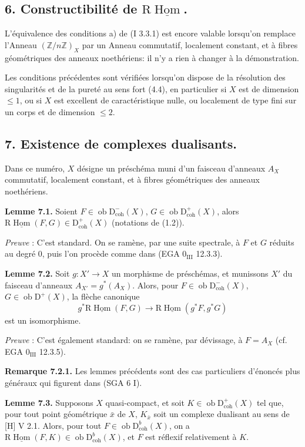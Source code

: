 \documentclass[11pt]{article}
\DeclareMathOperator{\Hom}{Hom}
\newcommand{\R}{\mathrm{R}}\newcommand{\RHomCore}{\mathrm{RHom}}
\newcommand{\D}{\mathrm{D}}
\newcommand{\Z}{\mathbb{Z}}
\newcommand{\ob}{\operatorname{ob}}
\providecommand{\Hom}{\operatorname{Hom}}
\providecommand{\ob}{\operatorname{ob}}
\providecommand{\R}{\mathrm R}
\providecommand{\Z}{\mathbb Z}
\providecommand{\Hom}{\operatorname{Hom}}
\begin{document}
\subsection*{6. Constructibilité de $\R\underline{\Hom}$.}

L'équivalence des conditions a) de (I 3.3.1) est encore valable lorsqu'on remplace l'Anneau $(\Z/n\Z)_X$ par un Anneau commutatif, localement constant, et à fibres géométriques des anneaux noethériens: il n'y a rien à changer à la démonstration.

Les conditions précédentes sont vérifiées lorsqu'on dispose de la résolution des singularités et de la pureté au sens fort (4.4), en particulier si $X$ est de dimension $\leq1$, ou si $X$ est excellent de caractéristique nulle, ou localement de type fini sur un corps et de dimension $\leq2$.

\subsection*{7. Existence de complexes dualisants.}

Dans ce numéro, $X$ désigne un préschéma muni d'un faisceau d'anneaux $A_X$ commutatif, localement constant, et à fibres géométriques des anneaux noethériens.

\textbf{Lemme 7.1.} Soient $F\in\ob\D^{-}_{\mathrm{coh}}(X)$, $G\in\ob\D^{+}_{\mathrm{coh}}(X)$, alors $\R\underline{\Hom}(F,G)\in\D^{+}_{\mathrm{coh}}(X)$ (notations de (1.2)).

\emph{Preuve} : C'est standard. On se ramène, par une suite spectrale, à $F$ et $G$ réduits au degré $0$, puis l'on procède comme dans (EGA $0_{\mathrm{III}}$ 12.3.3).

\textbf{Lemme 7.2.} Soit $g:X'\to X$ un morphisme de préschémas, et munissons $X'$ du faisceau d'anneaux $A_{X'}=g^*(A_X)$. Alors, pour $F\in\ob\D^{-}_{\mathrm{coh}}(X)$, $G\in\ob\D^{+}(X)$, la flèche canonique
\[
        g^*\R\underline{\Hom}(F,G)\longrightarrow \R\underline{\Hom}(g^*F,g^*G)
\]
est un isomorphisme.

\emph{Preuve} : C'est également standard: on se ramène, par dévissage, à $F=A_X$ (cf. EGA $0_{\mathrm{III}}$ 12.3.5).

\textbf{Remarque 7.2.1.} Les lemmes précédents sont des cas particuliers d'énoncés plus généraux qui figurent dans (SGA 6 I).

\textbf{Lemme 7.3.} Supposons $X$ quasi-compact, et soit $K\in\ob\D^{+}_{\mathrm{coh}}(X)$ tel que, pour tout point géométrique $\bar{x}$ de $X$, $K_{\bar{x}}$ soit un complexe dualisant au sens de [H] V 2.1. Alors, pour tout $F\in\ob\D^{b}_{\mathrm{coh}}(X)$, on a $\R\underline{\Hom}(F,K)\in\ob\D^{b}_{\mathrm{coh}}(X)$, et $F$ est réflexif relativement à $K$.
\end{document}
